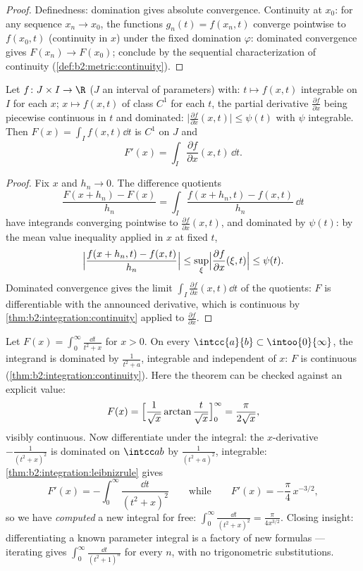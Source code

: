 \begin{proof}
Definedness: domination gives absolute convergence. Continuity at
$x_0$: for any sequence $x_n \to x_0$, the functions $g_n(t) =
f(x_n, t)$ converge pointwise to $f(x_0, t)$ (continuity in $x$)
under the fixed domination $\varphi$: dominated convergence gives
$F(x_n) \to F(x_0)$; conclude by the sequential characterization of
continuity (\cref{def:b2:metric:continuity}).
\end{proof}

\begin{theorem}\label{thm:b2:integration:leibnizrule}
Let $f \colon J \times I \to \R$ ($J$ an interval of parameters)
with: $t \mapsto f(x,t)$ integrable on $I$ for each $x$; $x \mapsto
f(x,t)$ of class $C^1$ for each $t$, the partial derivative
$\frac{\partial f}{\partial x}$ being piecewise continuous in $t$
and dominated: $\bigl|\frac{\partial f}{\partial x}(x,t)\bigr| \leq
\psi(t)$ with $\psi$ integrable. Then $F(x) = \int_I f(x,t)\dd t$
is $C^1$ on $J$ and
\[
F'(x) = \int_I \frac{\partial f}{\partial x}(x, t)\,\dd t .
\]
\end{theorem}

\begin{proof}
Fix $x$ and $h_n \to 0$. The difference quotients
\[
\frac{F(x + h_n) - F(x)}{h_n}
= \int_I \frac{f(x + h_n, t) - f(x, t)}{h_n}\,\dd t
\]
have integrands converging pointwise to $\frac{\partial f}{\partial
x}(x, t)$, and dominated by $\psi(t)$: by the mean value
inequality applied in $x$ at fixed $t$,
\[
\Bigl|\frac{f(x + h_n, t) - f(x,t)}{h_n}\Bigr|
\leq \sup_{\xi} \Bigl|\frac{\partial f}{\partial x}(\xi, t)\Bigr|
\leq \psi(t) .
\]
Dominated convergence gives the limit $\int_I \frac{\partial
f}{\partial x}(x,t)\dd t$ of the quotients: $F$ is differentiable
with the announced derivative, which is continuous by
\cref{thm:b2:integration:continuity} applied to $\frac{\partial
f}{\partial x}$.
\end{proof}

\begin{example}\label{ex:b2:integration:arctanparam}
Let $F(x) = \displaystyle\int_0^\infty \frac{\dd t}{t^2 + x}$
for $x > 0$. On every $\intcc{a}{b} \subset \intoo{0}{\infty}$,
the integrand is dominated by $\frac{1}{t^2 + a}$, integrable
and independent of $x$: $F$ is continuous
(\cref{thm:b2:integration:continuity}). Here the theorem can be
checked against an explicit value:
\[
F(x) = \Bigl[\frac{1}{\sqrt x}\arctan\frac{t}{\sqrt
x}\Bigr]_0^\infty = \frac{\pi}{2\sqrt x} ,
\]
visibly continuous. Now differentiate under the integral: the
$x$-derivative $-\frac{1}{(t^2+x)^2}$ is dominated on
$\intcc ab$ by $\frac{1}{(t^2+a)^2}$, integrable:
\cref{thm:b2:integration:leibnizrule} gives
\[
F'(x) = -\int_0^\infty \frac{\dd t}{(t^2 + x)^2}
\qquad\text{while}\qquad
F'(x) = -\frac{\pi}{4}\,x^{-3/2} ,
\]
so we have \emph{computed} a new integral for free:
$\int_0^\infty\frac{\dd t}{(t^2+x)^2} = \frac{\pi}{4x^{3/2}}$.
Closing insight: differentiating a known parameter integral is a
factory of new formulas --- iterating gives
$\int_0^\infty\frac{\dd t}{(t^2+1)^n}$ for every $n$, with no
trigonometric substitutions.
\end{example}


